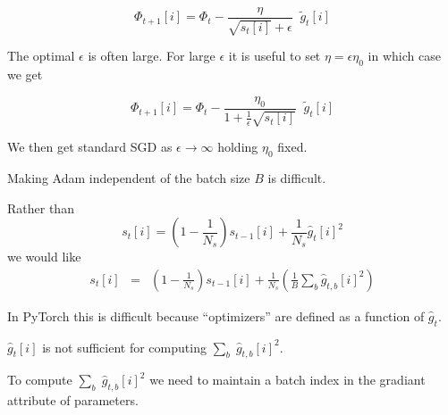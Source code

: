 {

$$\Phi_{t+1}[i] =  \Phi_t - \frac{\eta}{\sqrt{s_{t}[i]} + \epsilon}\;\;\tilde{g}_{t}[i]$$

\vfill
The optimal $\epsilon$ is often large.
For large $\epsilon$ it is useful to set $\eta = \epsilon\eta_0$ in which case we get

$$\Phi_{t+1}[i] =  \Phi_t - \frac{\eta_0}{1 + \frac{1}{\epsilon}\sqrt{s_{t}[i]}}\;\;\tilde{g}_{t}[i]$$

\vfill
We then get standard SGD  as $\epsilon \rightarrow \infty$ holding $\eta_0$ fixed.


Making Adam independent of the batch size $B$ is difficult.

\vfill
Rather than
$$s_t[i] = \left(1-\frac{1}{N_s}\right) s_{t-1}[i] + \frac{1}{N_s} \hat{g}_t[i]^2$$
\vfill
we would like
\begin{eqnarray*}
s_t[i] & = &  \left(1-\frac{1}{N_s}\right) s_{t-1}[i] + \frac{1}{N_s} \left(\frac{1}{B} \sum_b \hat{g}_{t,b}[i]^2\right)
\end{eqnarray*}


In PyTorch this is difficult because ``optimizers'' are defined as a function of $\hat{g}_t$.

\vfill
$\hat{g}_t[i]$ is not sufficient for computing $\sum_b \;\hat{g}_{t,b}[i]^2$.

\vfill
To compute $\sum_b \;\hat{g}_{t,b}[i]^2$ we need to maintain a batch index in the gradiant attribute of parameters.


} 

